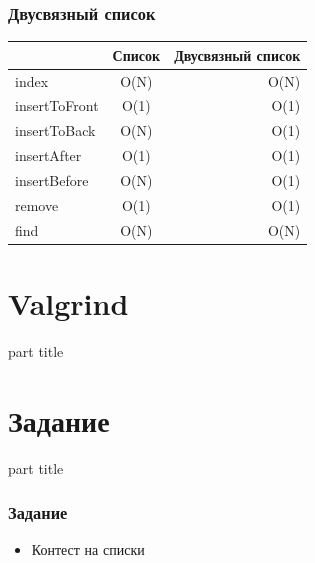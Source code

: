 \documentclass[14pt,pdf,hyperref={unicode}]{beamer}
\begin{document}
\begin{frame}[fragile]
\frametitle{Двусвязный список}
\begin{center}
  \begin{tabular}{  l | c r }
      & Список & Двусвязный список \\
    \hline
    index & O(N) &  O(N) \\
    insertToFront & O(1) & O(1) \\
    insertToBack & O(N) & O(1) \\
    insertAfter & O(1) & O(1) \\
    insertBefore & O(N) & O(1) \\
    remove & O(1) & O(1) \\
    find & O(N) & O(N) \\
    \hline
  \end{tabular}
\end{center}
\end{frame}



\section{Valgrind}
\begin{frame}
\begin{center}
\begin{beamercolorbox}[sep=8pt,center]{part
title}
\insertsection
\end{beamercolorbox}
\end{center}
\end{frame}




\section{Задание}
\begin{frame}
\begin{center}
\begin{beamercolorbox}[sep=8pt,center]{part
title}
\insertsection
\end{beamercolorbox}
\end{center}
\end{frame}

\begin{frame}[fragile]
\frametitle{Задание} 
\begin{itemize}
\item Контест на списки
\end{itemize}
\end{frame}
\end{document}

